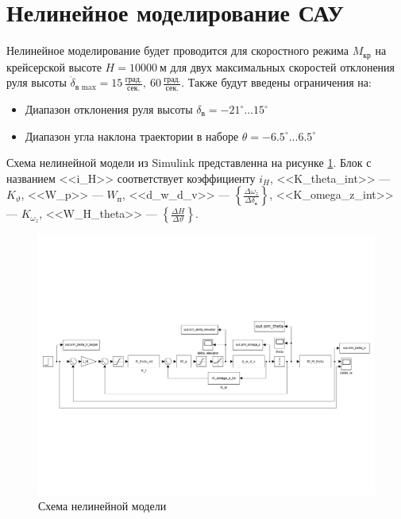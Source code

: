 \section{Нелинейное моделирование САУ}
Нелинейное моделирование будет проводится для скоростного режима $M_\text{кр}$
на крейсерской высоте $H = 10000\ \text{м}$ для двух максимальных скоростей
отклонения руля высоты $\dot{\delta}_\text{в max} = 15\, \frac{\text{град.}}{\text{сек.}},\ 60\, \frac{\text{град.}}{\text{сек.}}$. Также будут введены ограничения на:

\begin{itemize}
    \item Диапазон отклонения руля высоты $\delta_\text{в} = -21^\circ ... 15^\circ$ 
    \item Диапазон угла наклона траектории в наборе $\theta = -6.5^\circ...6.5^\circ$
\end{itemize}

Схема нелинейной модели из Simulink представленна на рисунке \ref{fig:nonlinear_model_simulink}. 
Блок с названием <<i\_H>> соответствует коэффициенту $i_H$, <<K\_theta\_int>>
---  $K_\vartheta$, <<W\_p>> --- $W_{п}$, <<d\_w\_d\_v>> --- $\left\{ \frac{\Delta
\omega_z}{\Delta \delta_{в}} \right\} $, <<K\_omega\_z\_int>> --- $K_{\omega_z}$,
<<W\_H\_theta>> --- $\left\{ \frac{\Delta H}{\Delta \vartheta} \right\} $.

\begin{figure}[H]
    \centering
    \includegraphics[clip, trim=0.4cm 6cm 0.4cm 7cm , width=1.00\textwidth]{./figures/model.pdf}
    \caption{Схема нелинейной модели}
    \label{fig:nonlinear_model_simulink}
\end{figure}

